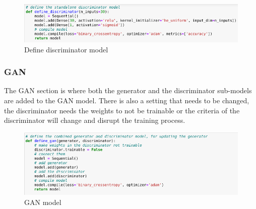 \documentclass{report} %
\begin{document}
\begin{figure}[H]
\centering
\includegraphics[width=1.25\textwidth]{discriminator}
\caption{Define discriminator model\protect}
 \label{board}
\end{figure}

\subsubsection{GAN}
The GAN section is where both the generator and the discriminator sub-models are added to the GAN model. There is also a setting that needs to be changed, the discriminator needs the weights to not be trainable or the criteria of the discriminator will change and disrupt the training process. 

\begin{figure}[H]
\centering
\includegraphics[width=1.25\textwidth]{gan}
\caption{GAN model\protect}
 \label{board}
\end{figure}
\end{document}
